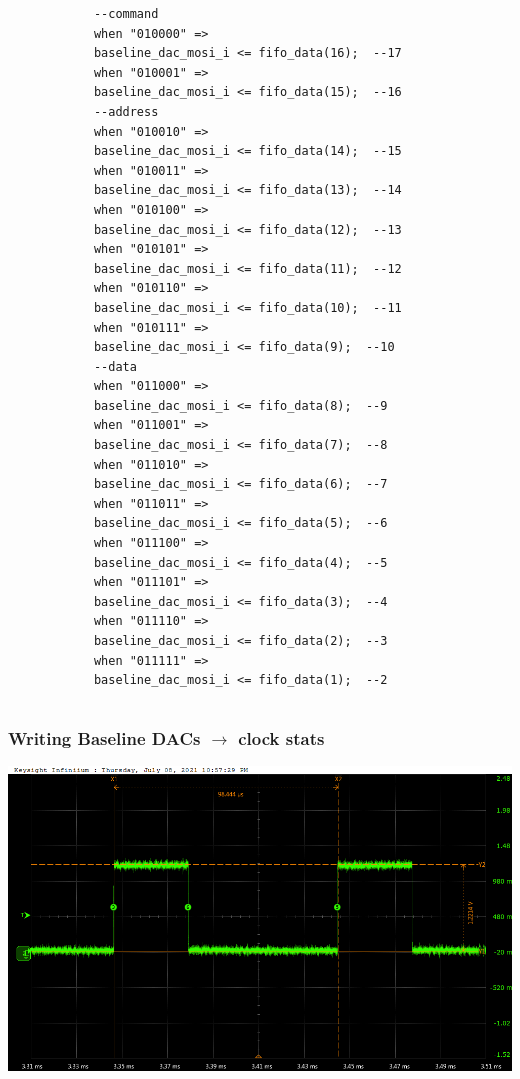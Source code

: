 \documentclass[aspectratio=169]{beamer}
\begin{document}
\begin{frame}[fragile]
{\begin{columns}
		\begin{center}
			\begin{verbatim}
			--command
			when "010000" =>
			baseline_dac_mosi_i <= fifo_data(16);  --17
			when "010001" =>
			baseline_dac_mosi_i <= fifo_data(15);  --16
			--address
			when "010010" =>
			baseline_dac_mosi_i <= fifo_data(14);  --15
			when "010011" =>
			baseline_dac_mosi_i <= fifo_data(13);  --14
			when "010100" =>
			baseline_dac_mosi_i <= fifo_data(12);  --13
			when "010101" =>
			baseline_dac_mosi_i <= fifo_data(11);  --12
			when "010110" =>
			baseline_dac_mosi_i <= fifo_data(10);  --11
			when "010111" =>
			baseline_dac_mosi_i <= fifo_data(9);  --10
			--data
			when "011000" =>
			baseline_dac_mosi_i <= fifo_data(8);  --9
			when "011001" =>
			baseline_dac_mosi_i <= fifo_data(7);  --8
			when "011010" =>
			baseline_dac_mosi_i <= fifo_data(6);  --7
			when "011011" =>
			baseline_dac_mosi_i <= fifo_data(5);  --6
			when "011100" =>
			baseline_dac_mosi_i <= fifo_data(4);  --5
			when "011101" =>
			baseline_dac_mosi_i <= fifo_data(3);  --4
			when "011110" =>
			baseline_dac_mosi_i <= fifo_data(2);  --3
			when "011111" =>
			baseline_dac_mosi_i <= fifo_data(1);  --2
			\end{verbatim}
		\end{center}
		\end{columns} 
	}
	\end{frame}

	\begin{frame}
	\frametitle{Writing Baseline DACs $\rightarrow$ clock stats}
	\begin{center}
		\includegraphics[width=0.65 \textwidth]{IMG/probe/09-08-2021_clock-specks.png}
	\end{center}
	\end{frame}
\end{document}

